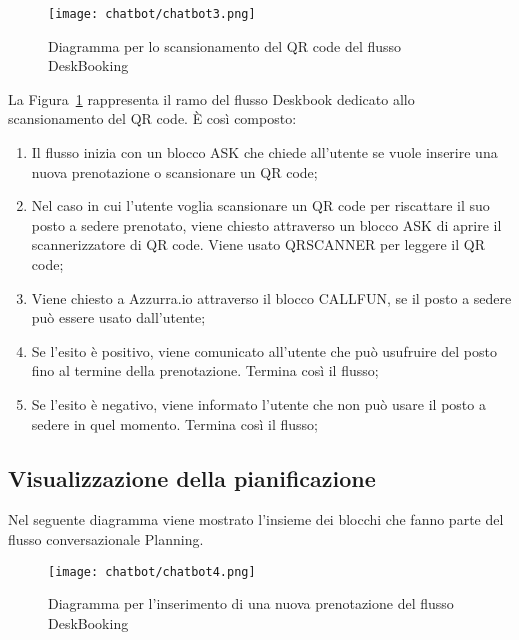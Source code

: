 \begin{figure}[h]
	\centering
	\texttt{[image: chatbot/chatbot3.png]}
	\caption{Diagramma per lo scansionamento del \gls{QR code}\ap{[g]} del flusso DeskBooking}\label{fig:qrcode}
\end{figure}

La Figura~\ref{fig:qrcode} rappresenta il ramo del flusso Deskbook dedicato allo scansionamento del \gls{QR code}\ap{[g]}. È così composto:

\begin{enumerate}
	\item Il flusso inizia con un blocco ASK che chiede all'utente se vuole inserire una nuova prenotazione o scansionare un \gls{QR code}\ap{[g]};
	\item Nel caso in cui l'utente voglia scansionare un \gls{QR code}\ap{[g]} per riscattare il suo posto a sedere prenotato, viene chiesto attraverso un blocco ASK di aprire il scannerizzatore di \gls{QR code}\ap{[g]}. Viene usato QRSCANNER per leggere il \gls{QR code}\ap{[g]};
	\item Viene chiesto a Azzurra.io attraverso il blocco CALLFUN, se il posto a sedere può essere usato dall'utente;
	\item Se l'esito è positivo, viene comunicato all'utente che può usufruire del posto fino al termine della prenotazione. Termina così il flusso;
	\item Se l'esito è negativo, viene informato l'utente che non può usare il posto a sedere in quel momento. Termina così il flusso;
\end{enumerate}

\subsection{Visualizzazione della pianificazione}
Nel seguente diagramma viene mostrato l'insieme dei blocchi che fanno parte del flusso conversazionale Planning.

\begin{figure}[h]
	\centering
	\texttt{[image: chatbot/chatbot4.png]}
	\caption{Diagramma per l'inserimento di una nuova prenotazione del flusso DeskBooking}\label{fig:plan}
\end{figure}

